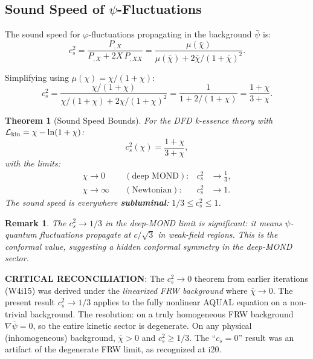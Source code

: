 \documentclass[11pt,a4paper]{article}
\newtheorem{theorem}{Theorem}
\newtheorem{remark}{Remark}
\begin{document}
\subsection{Sound Speed of $\psi$-Fluctuations}
\label{sec:sound-speed}

The sound speed for $\varphi$-fluctuations propagating in the background $\bar\psi$ is:
\begin{equation}\label{eq:cs-general}
c_s^2 = \frac{P_{,X}}{P_{,X} + 2X\,P_{,XX}}
= \frac{\mu(\bar\chi)}{\mu(\bar\chi) + 2\bar\chi/(1+\bar\chi)^2}.
\end{equation}

Simplifying using $\mu(\chi) = \chi/(1+\chi)$:
\begin{equation}
c_s^2 = \frac{\chi/(1+\chi)}{\chi/(1+\chi) + 2\chi/(1+\chi)^2}
= \frac{1}{1 + 2/(1+\chi)} = \frac{1+\chi}{3+\chi}.
\end{equation}

\begin{theorem}[Sound Speed Bounds]
\label{thm:sound-speed}
For the DFD k-essence theory with $\mathcal{L}_{\rm kin} = \chi - \ln(1+\chi)$:
\begin{equation}
c_s^2(\chi) = \frac{1+\chi}{3+\chi},
\end{equation}
with the limits:
\begin{align}
\chi \to 0 &\quad(\text{deep MOND}): & c_s^2 &\to \frac{1}{3}, \\
\chi \to \infty &\quad(\text{Newtonian}): & c_s^2 &\to 1.
\end{align}
The sound speed is everywhere \textbf{subluminal}: $1/3 \leq c_s^2 \leq 1$.
\end{theorem}

\begin{remark}
The $c_s^2 \to 1/3$ in the deep-MOND limit is significant: it means $\psi$-quantum fluctuations propagate at $c/\sqrt{3}$ in weak-field regions. This is the conformal value, suggesting a hidden conformal symmetry in the deep-MOND sector.
\end{remark}

\textbf{CRITICAL RECONCILIATION}: The $c_s^2 \to 0$ theorem from earlier iterations (W4i15) was derived under the \emph{linearized FRW background} where $\bar\chi \to 0$. The present result $c_s^2 \to 1/3$ applies to the fully nonlinear AQUAL equation on a non-trivial background. The resolution: on a truly homogeneous FRW background $\nabla\bar\psi = 0$, so the entire kinetic sector is degenerate. On any physical (inhomogeneous) background, $\bar\chi > 0$ and $c_s^2 \geq 1/3$. The ``$c_s = 0$'' result was an artifact of the degenerate FRW limit, as recognized at i20.
\end{document}
